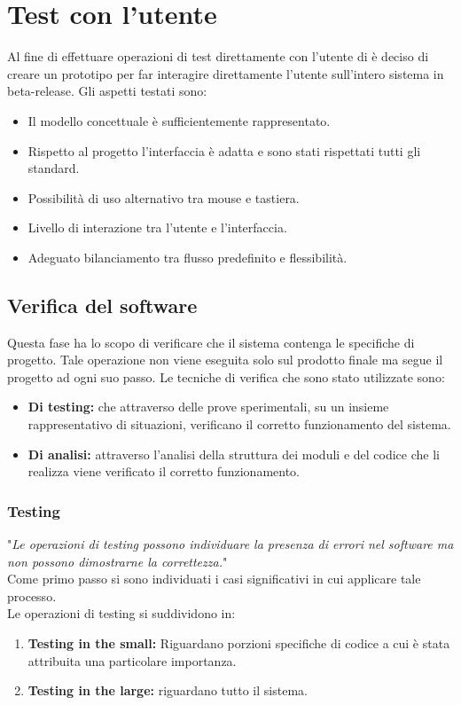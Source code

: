 \documentclass[a4paper,final,12pt]{report}
\begin{document}
\section{Test con l'utente}
Al fine di effettuare operazioni di test direttamente con l'utente di è deciso di creare un prototipo per far interagire direttamente l'utente sull'intero sistema in beta-release.
Gli aspetti testati sono:
\begin{itemize}
\item Il modello concettuale è sufficientemente rappresentato.
\item Rispetto al progetto l'interfaccia è adatta e sono stati rispettati tutti gli standard.
\item Possibilità di uso alternativo tra mouse e tastiera.
\item Livello di interazione tra l'utente e l'interfaccia.
\item Adeguato bilanciamento tra flusso predefinito e flessibilità.
\end{itemize}

\subsection{Verifica del software}
Questa fase ha lo scopo di verificare che il sistema contenga le specifiche di progetto. Tale operazione non viene eseguita solo sul prodotto finale ma segue il progetto ad ogni suo passo.
Le tecniche di verifica che sono stato utilizzate sono:
\begin{itemize}
\item \textbf{Di testing:} che attraverso delle prove sperimentali, su un insieme rappresentativo di situazioni, verificano il corretto funzionamento del sistema. 
\item \textbf{Di analisi:} attraverso l'analisi della struttura dei moduli e del codice che li realizza viene verificato il corretto funzionamento. 
\end{itemize}

\subsubsection{Testing}
"\textit{Le operazioni di testing possono individuare la presenza di errori nel software ma non possono dimostrarne la correttezza.}"\cite{1}\\
Come primo passo si sono individuati i casi significativi in cui applicare tale processo.\\
Le operazioni di testing si suddividono in:
\begin{enumerate}
\item \textbf{Testing in the small:} Riguardano porzioni specifiche di codice a cui è stata attribuita una particolare importanza.
\item \textbf{Testing in the large:} riguardano tutto il sistema.
\end{enumerate}
\end{document}
